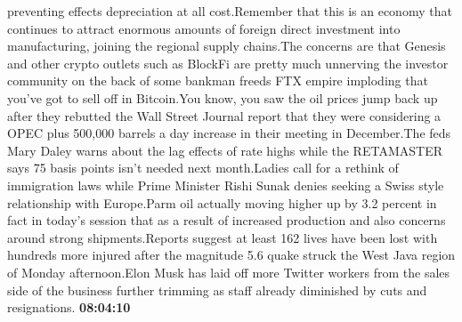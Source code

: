 \documentclass{article}%
\begin{document}
preventing effects depreciation at all cost.Remember that this is an economy that continues to attract enormous amounts of foreign direct investment into manufacturing, joining the regional supply chains.The concerns are that Genesis and other crypto outlets such as BlockFi are pretty much unnerving the investor community on the back of some bankman freeds FTX empire imploding that you've got to sell off in Bitcoin.You know, you saw the oil prices jump back up after they rebutted the Wall Street Journal report that they were considering a OPEC plus 500,000 barrels a day increase in their meeting in December.The feds Mary Daley warns about the lag effects of rate highs while the RETAMASTER says 75 basis points isn't needed next month.Ladies call for a rethink of immigration laws while Prime Minister Rishi Sunak denies seeking a Swiss style relationship with Europe.Parm oil actually moving higher up by 3.2 percent in fact in today's session that as a result of increased production and also concerns around strong shipments.Reports suggest at least 162 lives have been lost with hundreds more injured after the magnitude 5.6 quake struck the West Java region of Monday afternoon.Elon Musk has laid off more Twitter workers from the sales side of the business further trimming as staff already diminished by cuts and resignations.%
\textbf{08:04:10}%
\newline%
\end{document}

